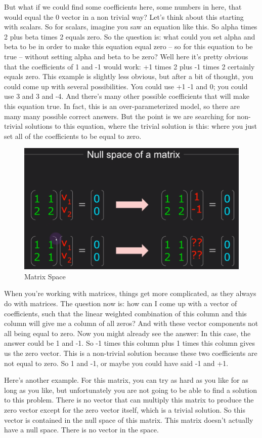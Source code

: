 \documentclass[fleqn,10pt]{olplainarticle}
\theoremstyle{definition}
\theoremstyle{remark}
\begin{document}
But what if we could find some coefficients here, some numbers in here, that would equal the 0 vector in a non trivial way? Let's think about this starting with scalars. So for scalars, imagine you saw an equation like this. So alpha times 2 plus beta times 2 equals zero. So the question is: what could you set alpha and beta to be in order to make this equation equal zero -- so for this equation to be true -- without setting alpha and beta to be zero? Well here it's pretty obvious that the coefficients of 1 and -1 would work: +1 times 2 plus -1 times 2 certainly equals zero. This example is slightly less obvious, but after a bit of thought, you could come up with several possibilities. You could use +1 -1 and 0; you could use 3 and 3 and -4. And there's many other possible coefficients that will make this equation true. In fact, this is an over-parameterized model, so there are many many possible correct answers. But the point is we are searching for non-trivial solutions to this equation, where the trivial solution is this: where you just set all of the coefficients to be equal to zero.

\begin{figure}[ht]
	\centering
	\includegraphics[width=0.5\linewidth]{images/matrix-space-18.png}
	\caption{Matrix Space}
	\label{fig:matrix_space_18}
\end{figure}

When you're working with matrices, things get more complicated, as they always do with matrices. The question now is: how can I come up with a vector of coefficients, such that the linear weighted combination of this column and this column will give me a column of all zeros? And with these vector components not all being equal to zero. Now you might already see the answer: In this case, the answer could be 1 and -1. So -1 times this column plus 1 times this column gives us the zero vector. This is a non-trivial solution because these two coefficients are not equal to zero. So 1 and -1, or maybe you could have said -1 and +1.

Here's another example. For this matrix, you can try as hard as you like for as long as you like, but unfortunately you are not going to be able to find a solution to this problem. There is no vector that can multiply this matrix to produce the zero vector except for the zero vector itself, which is a trivial solution. So this vector is contained in the null space of this matrix. This matrix doesn't actually have a null space. There is no vector in the space.
\end{document}
